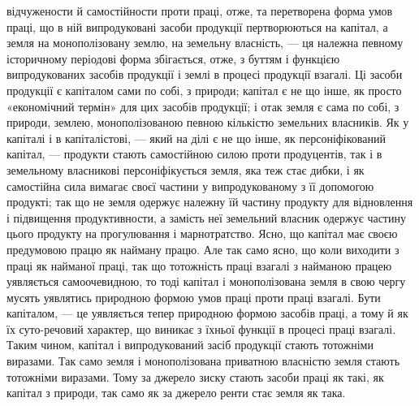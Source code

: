\parcont{}  %
відчужености й самостійности проти праці, отже, та перетворена форма умов
праці, що в ній випродуковані засоби продукції пертворюються на капітал, а
земля на монополізовану землю, на земельну власність, — ця належна певному
історичному періодові форма збігається, отже, з буттям і функцією випродукованих
засобів продукції і землі в процесі продукції взагалі. Ці засоби продукції
є капіталом сами по собі, з природи; капітал є не що інше, як просто «економічний
термін» для цих засобів продукції; і отак земля є сама по собі, з
природи, землею, монополізованою певною кількістю земельних власників. Як
у капіталі і в капіталістові, — який на ділі є не що інше, як персоніфікований
капітал, — продукти стають самостійною силою проти продуцентів, так і в земельному
власникові персоніфікується земля, яка теж стає дибки, і як самостійна
сила вимагає своєї частини у випродукованому з її допомогою продукті;
так що не земля одержує належну їй частину продукту для відновлення
і підвищення продуктивности, а замість неї земельний власник одержує частину
цього продукту на прогулювання і марнотратство. Ясно, що капітал має
своєю предумовою працю як найману працю. Але так само ясно, що коли виходити
з праці як найманої праці, так що тотожність праці взагалі з найманою
працею уявляється самоочевидною, то тоді капітал і монополізована земля
в свою чергу мусять уявлятись природною формою умов праці проти праці
взагалі. Бути капіталом, — це уявляється тепер природною формою засобів праці,
а тому й як їх суто-речовий характер, що виникає з їхньої функції
в процесі праці взагалі. Таким чином, капітал і випродукований засіб продукції
стають тотожніми виразами. Так само земля і монополізована приватною власністю
земля стають тотожніми виразами. Тому за джерело зиску стають засоби
праці як такі, як капітал з природи, так само як за джерело ренти стає земля
як така.

